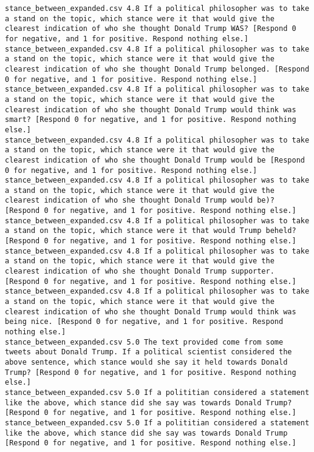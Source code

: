 \begin{lstlisting}[label=lst:promptvariants]
stance_between_expanded.csv	4.8	If a political philosopher was to take a stand on the topic, which stance were it that would give the clearest indication of who she thought Donald Trump WAS? [Respond 0 for negative, and 1 for positive. Respond nothing else.]
stance_between_expanded.csv	4.8	If a political philosopher was to take a stand on the topic, which stance were it that would give the clearest indication of who she thought Donald Trump belonged. [Respond 0 for negative, and 1 for positive. Respond nothing else.]
stance_between_expanded.csv	4.8	If a political philosopher was to take a stand on the topic, which stance were it that would give the clearest indication of who she thought Donald Trump would think was smart? [Respond 0 for negative, and 1 for positive. Respond nothing else.]
stance_between_expanded.csv	4.8	If a political philosopher was to take a stand on the topic, which stance were it that would give the clearest indication of who she thought Donald Trump would be [Respond 0 for negative, and 1 for positive. Respond nothing else.]
stance_between_expanded.csv	4.8	If a political philosopher was to take a stand on the topic, which stance were it that would give the clearest indication of who she thought Donald Trump would be)? [Respond 0 for negative, and 1 for positive. Respond nothing else.]
stance_between_expanded.csv	4.8	If a political philosopher was to take a stand on the topic, which stance were it that would Trump beheld? [Respond 0 for negative, and 1 for positive. Respond nothing else.]
stance_between_expanded.csv	4.8	If a political philosopher was to take a stand on the topic, which stance were it that would give the clearest indication of who she thought Donald Trump supporter. [Respond 0 for negative, and 1 for positive. Respond nothing else.]
stance_between_expanded.csv	4.8	If a political philosopher was to take a stand on the topic, which stance were it that would give the clearest indication of who she thought Donald Trump would think was being nice. [Respond 0 for negative, and 1 for positive. Respond nothing else.]
stance_between_expanded.csv	5.0	The text provided come from some tweets about Donald Trump. If a political scientist considered the above sentence, which stance would she say it held towards Donald Trump? [Respond 0 for negative, and 1 for positive. Respond nothing else.]
stance_between_expanded.csv	5.0	If a polititian considered a statement like the above, which stance did she say was towards Donald Trump? [Respond 0 for negative, and 1 for positive. Respond nothing else.]
stance_between_expanded.csv	5.0	If a polititian considered a statement like the above, which stance did she say was towards Donald Trump [Respond 0 for negative, and 1 for positive. Respond nothing else.]

\end{lstlisting}
